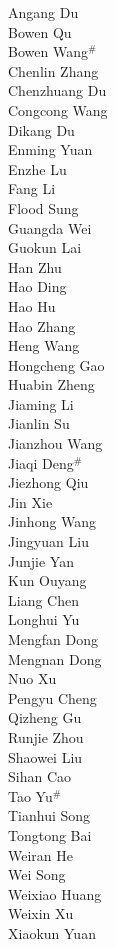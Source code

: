 \documentclass{article}
\begin{document}
\begin{multicols}{2}
Angang Du \\
Bowen Qu \\
Bowen Wang${^\#}$ \\
Chenlin Zhang \\
Chenzhuang Du \\
Congcong Wang \\
Dikang Du \\
Enming Yuan \\
Enzhe Lu \\
Fang Li \\
Flood Sung \\
Guangda Wei \\
Guokun Lai \\
Han Zhu \\
Hao Ding \\
Hao Hu \\
Hao Zhang \\
Heng Wang \\
Hongcheng Gao \\
Huabin Zheng \\
Jiaming Li \\
Jianlin Su \\
Jianzhou Wang \\
Jiaqi Deng${^\#}$ \\
Jiezhong Qiu \\
Jin Xie \\
Jinhong Wang \\
Jingyuan Liu \\
Junjie Yan \\
Kun Ouyang\\
Liang Chen \\
Longhui Yu \\
Mengfan Dong \\
Mengnan Dong \\
Nuo Xu \\
Pengyu Cheng \\
Qizheng Gu \\
Runjie Zhou \\
Shaowei Liu \\
Sihan Cao \\
Tao Yu$^\#$ \\
Tianhui Song \\
Tongtong Bai \\
Weiran He \\
Wei Song \\
Weixiao Huang \\
Weixin Xu \\
Xiaokun Yuan \\

\end{multicols}
\end{document}
